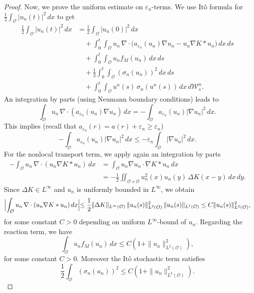 \documentclass[10pt,number,preprint,times]{elsarticle}
\numberwithin{equation}{section} %
\begin{document}
\begin{proof}
{Now, we prove the uniform estimate on $\varepsilon_n$-terms. We use It\^o formula for $\displaystyle \frac{1}{2}\int_{\mathcal{O}}|u_n(t)|^2\,dx$ to get
\begin{equation}\begin{split}\label{eq:v+w-tmp2}
\frac{1}{2}\int_{\mathcal{O}}|u_n(t)|^2\,dx &= \frac{1}{2}\int_{\mathcal{O}}|u_n(0)|^2\,dx \\
&\quad +\int_0^t\int_{\mathcal O} u_n\,\nabla\cdot\big(a_{\varepsilon_n}(u_n)\nabla u_n - u_n\nabla K*u_n\big)\,dx\,ds \\
&\quad + \int_0^t\int_{\mathcal O} u_n f_M(u_n)\,dx\,ds \\
&\quad + \frac{1}{2} \int_0^t\int_{\mathcal O} (\sigma_{n}(u_n))^2\,dx\,ds\\
&\quad+ \int_0^t\int_{\mathcal{O}} u^n(s)\,\sigma_n(u^n(s)) \,dx\,d\mathcal{W}^n_s.
\end{split}\end{equation}
An integration by parts (using Neumann boundary conditions) leads to
$$
\int_{\mathcal O} u_n\,\nabla\cdot(a_{\varepsilon_n}(u_n)\nabla u_n)\,dx
= -\int_{\mathcal O} a_{\varepsilon_n}(u_n)|\nabla u_n|^2\,dx.
$$
This implies (recall that $a_{\varepsilon_n}(r)=a(r)+\varepsilon_n\ge \varepsilon_n$)
$$
-\int_{\mathcal O} a_{\varepsilon_n}(u_n)|\nabla u_n|^2\,dx \le -\varepsilon_n\int_{\mathcal O}|\nabla u_n|^2\,dx.
$$
For the nonlocal transport term, we apply again an integration by parts
\begin{align*}
-\int_{\mathcal O} u_n\,\nabla\cdot(u_n\nabla K*u_n)\,dx
&=\int_{\mathcal O} u_n \nabla u_n\cdot\nabla K*u_n\,dx\\
&= - \frac{1}{2}\iint_{\mathcal O\times\mathcal O} u_n^2(x)u_n(y)\,\Delta K(x-y)\,dx\,dy.
\end{align*}
Since $\Delta K\in L^\infty$ and $u_n$ is uniformly bounded in $L^\infty$, we obtain
\begin{align*}
\Bigl|\int_{\mathcal O} u_n\,\nabla\cdot(u_n\nabla K*u_n)\,dx\Bigl| \le \frac{1}{2}\|\Delta K\|_{L^\infty({\mathcal{O}})}\,\|u_n(s)\|_{L^2({\mathcal{O}})}^2\,\|u_n(s)\|_{L^1({\mathcal{O}})}
\le C\|u_n(s)\|_{L^2({\mathcal{O}})}^2,
\end{align*}
for some constant $C>0$ depending on uniform $L^\infty$-bound of $u_n$. 
Regarding the reaction term, we have 
$$
\int_{\mathcal O} u_n f_M(u_n)\,dx \le C(1+\|u_n\|_{L^2({\mathcal{O}})}^2), 
$$
for some constant $C>0$. Moreover the It\^o stochastic term satisfies
$$
\frac{1}{2} \int_{\mathcal{O}} (\sigma_{n}(u_n))^2\le C(1+\|u_n\|_{L^2({\mathcal{O}})}^2).
$$

}
\end{proof}
\end{document}
